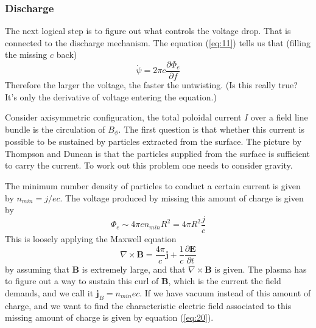 \documentclass[letterpaper, 11pt]{article}
\numberwithin{equation}{section}
\numberwithin{figure}{section}
\begin{document}
\subsubsection{Discharge}
\label{sec:discharge}

The next logical step is to figure out what controls the voltage drop. That is connected to the discharge mechanism. The equation (\ref{eq:11}) tells us that (filling the missing $c$ back)
\begin{equation}
    \label{eq:19}
    \dot{\psi} = 2\pi c\frac{\partial \Phi_e}{\partial f}
\end{equation}
Therefore the larger the voltage, the faster the untwisting. (Is this really true? It's only the derivative of voltage entering the equation.)

Consider axisymmetric configuration, the total poloidal current $I$ over a field line bundle is the circulation of $B_{\phi}$. The first question is that whether this current is possible to be sustained by particles extracted from the surface. The picture by Thompson and Duncan is that the particles supplied from the surface is sufficient to carry the current. To work out this problem one needs to consider gravity.

The minimum number density of particles to conduct a certain current is given by $n_{min} = j/ec$. The voltage produced by missing this amount of charge is given by
\begin{equation}
    \label{eq:20}
    \Phi_{e} \sim 4\pi e n_{min}R^2 = 4\pi R^2\frac{j}{c}
\end{equation}
This is loosely applying the Maxwell equation
\begin{equation}
    \label{eq:21}
    \nabla\times \boldsymbol{B} = \frac{4\pi}{c}\boldsymbol{j} + \frac{1}{c}\frac{\partial \boldsymbol{E}}{\partial t}
\end{equation}
by assuming that $\boldsymbol{B}$ is extremely large, and that $\nabla\times \boldsymbol{B}$ is given. The plasma has to figure out a way to sustain this curl of $\boldsymbol{B}$, which is the current the field demands, and we call it $\boldsymbol{j}_{B} = n_{min}ec$. If we have vacuum instead of this amount of charge, and we want to find the characteristic electric field associated to this missing amount of charge is given by equation (\ref{eq:20}).
\end{document}
